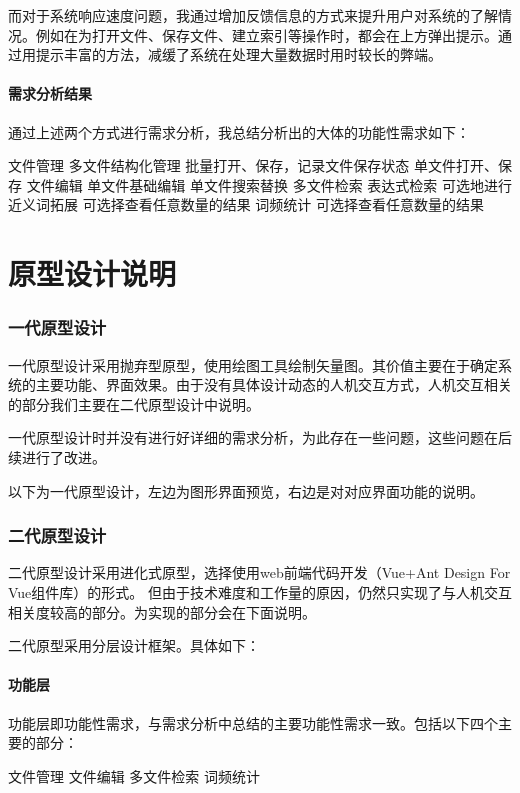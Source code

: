 \documentclass[scheme = chinese]{ctexart}
\begin{document}
而对于系统响应速度问题，我通过增加反馈信息的方式来提升用户对系统的了解情况。例如在为打开文件、保存文件、建立索引等操作时，都会在上方弹出提示。通过用提示丰富的方法，减缓了系统在处理大量数据时用时较长的弊端。

\subsection{需求分析结果}

通过上述两个方式进行需求分析，我总结分析出的大体的功能性需求如下：
\begin{outline}
    \1 文件管理
        \2 多文件结构化管理
        \2 批量打开、保存，记录文件保存状态
        \2 单文件打开、保存
    \1 文件编辑
        \2 单文件基础编辑
        \2 单文件搜索替换
    \1 多文件检索
        \2 表达式检索
        \2 可选地进行近义词拓展
        \2 可选择查看任意数量的结果
    \1 词频统计
        \2 可选择查看任意数量的结果
\end{outline}

\part{原型设计说明}
\section{一代原型设计}
一代原型设计采用抛弃型原型，使用绘图工具绘制矢量图。其价值主要在于确定系统的主要功能、界面效果。由于没有具体设计动态的人机交互方式，人机交互相关的部分我们主要在二代原型设计中说明。

一代原型设计时并没有进行好详细的需求分析，为此存在一些问题，这些问题在后续进行了改进。

以下为一代原型设计，左边为图形界面预览，右边是对对应界面功能的说明。



\section{二代原型设计}
二代原型设计采用进化式原型，选择使用web前端代码开发（Vue+Ant Design For Vue组件库）的形式。
但由于技术难度和工作量的原因，仍然只实现了与人机交互相关度较高的部分。为实现的部分会在下面说明。

二代原型采用分层设计框架。具体如下：

\subsection{功能层}
功能层即功能性需求，与需求分析中总结的主要功能性需求一致。包括以下四个主要的部分：
\begin{outline}
    \1 文件管理
    \1 文件编辑
    \1 多文件检索
    \1 词频统计
\end{outline}
\end{document}
